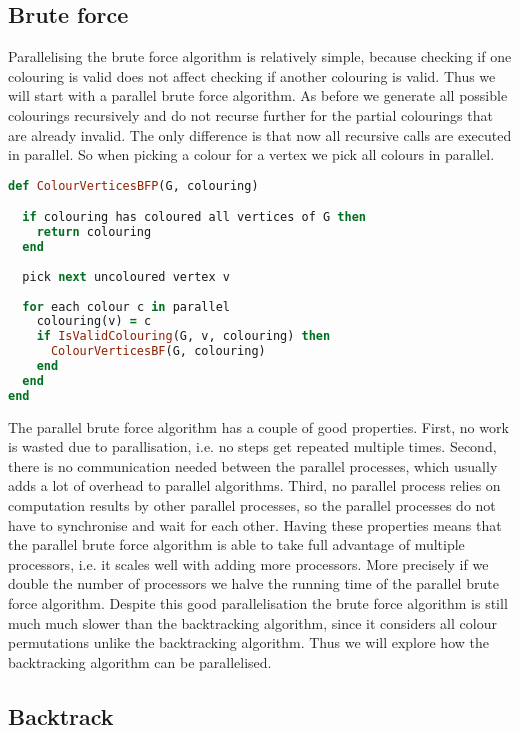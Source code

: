\documentclass{report}
\theoremstyle{plain}
\theoremstyle{definition}
\theoremstyle{remark}
\numberwithin{definition}{chapter}
\numberwithin{example}{chapter}
\numberwithin{figure}{chapter}
\numberwithin{theorem}{chapter}
\numberwithin{lemma}{chapter}
\begin{document}
\subsection{Brute force}

Parallelising the brute force algorithm is relatively simple, because checking if one colouring is valid does not affect checking if another colouring is valid. Thus we will start with a parallel brute force algorithm. As before we generate all possible colourings recursively and do not recurse further for the partial colourings that are already invalid. The only difference is that now all recursive calls are executed in parallel. So when picking a colour for a vertex we pick all colours in parallel.

\begin{lstlisting}[language=Ruby]
def ColourVerticesBFP(G, colouring)

  if colouring has coloured all vertices of G then
    return colouring
  end
  
  pick next uncoloured vertex v  
  
  for each colour c in parallel
    colouring(v) = c
    if IsValidColouring(G, v, colouring) then
      ColourVerticesBF(G, colouring)
    end
  end
end
\end{lstlisting}

The parallel brute force algorithm has a couple of good properties. First, no work is wasted due to parallisation, i.e. no steps get repeated multiple times. Second, there is no communication needed between the parallel processes, which usually adds a lot of overhead to parallel algorithms. Third, no parallel process relies on computation results by other parallel processes, so the parallel processes do not have to synchronise and wait for each other. Having these properties means that the parallel brute force algorithm is able to take full advantage of multiple processors, i.e. it scales well with adding more processors. More precisely if we double the number of processors we halve the running time of the parallel brute force algorithm. Despite this good parallelisation the brute force algorithm is still much much slower than the backtracking algorithm, since it considers all colour permutations unlike the backtracking algorithm. Thus we will explore how the backtracking algorithm can be parallelised.

\subsection{Backtrack}
\end{document}
